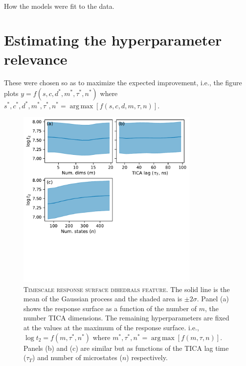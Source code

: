 \documentclass{article}
\DeclareMathOperator*{\argmax}{arg\,max}
\begin{document}
How the models were fit to the data. 

\section{Estimating the hyperparameter relevance}\label{sec:hp_relevance_calc}

These were chosen so as to maximize the expected improvement, i.e., the figure plots $y=f(s, c, d^{*}, m^{*}, \tau^{*}, n^{*})$ where $s^{*}, c^{*}, d^{*}, m^{*}, \tau^{*}, n^{*} = \argmax \left [f(s, c, d, m, \tau,n)\right]$.


\begin{figure}
    \centering
    \includegraphics[width=0.8\textwidth, trim={0, 4cm, 0, 0}, clip]{figures/response_surface_marginal_dihedrals_None_ts.pdf}
    \caption{\textsc{Timescale response surface dihedrals feature}. The solid line is the mean of the Gaussian process and the shaded area is $\pm 2\sigma$. Panel (a) shows the response surface as a function of the number of $m$, the number TICA dimensions. The remaining hyperparameters are fixed at the values at the maximum of the response surface. i.e., $\log{t_2}=f(m, \tau^{*}, n^{*})$ where $m^{*}, \tau^{*}, n^{*} = \argmax \left [f( m, \tau,n)\right]$. Panels (b) and (c) are similar but as functions of the TICA lag time ($
    \tau_{T}$) and number of microstates ($n$) respectively.}
    \label{fig:repsonse_diheds}
\end{figure}
\end{document}
